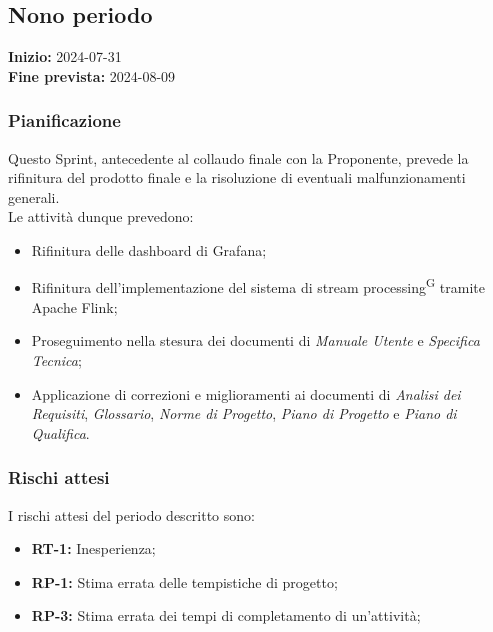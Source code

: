\documentclass[8pt]{article}
\newcommand{\glossterm}[1]{#1\textsuperscript{G}} %
\begin{document}
\subsection{Nono periodo}
\textbf{Inizio:} 2024-07-31\\
\textbf{Fine prevista:} 2024-08-09
\subsubsection{Pianificazione}
Questo Sprint, antecedente al collaudo finale con la Proponente, prevede la rifinitura del prodotto finale e la risoluzione di eventuali malfunzionamenti generali.\\Le attività dunque prevedono:
\begin{itemize}
    \item{Rifinitura delle dashboard di Grafana;}
    \item{Rifinitura dell'implementazione del sistema di \glossterm{stream processing} tramite Apache Flink;}
    \item Proseguimento nella stesura dei documenti di \textit{Manuale Utente} e \textit{Specifica Tecnica};
    \item Applicazione di correzioni e miglioramenti ai documenti di \textit{Analisi dei Requisiti}, \textit{Glossario}, \textit{Norme di Progetto}, \textit{Piano di Progetto} e \textit{Piano di Qualifica}.
\end{itemize} 
\subsubsection{Rischi attesi}
I rischi attesi del periodo descritto sono:
\begin{itemize}
    \setlength\itemsep{0em}
        \item \textbf{RT-1:} Inesperienza;
        \item \textbf{RP-1:} Stima errata delle tempistiche di progetto;
        \item \textbf{RP-3:} Stima errata dei tempi di completamento di un'attività;
    \end{itemize}
\end{document}
